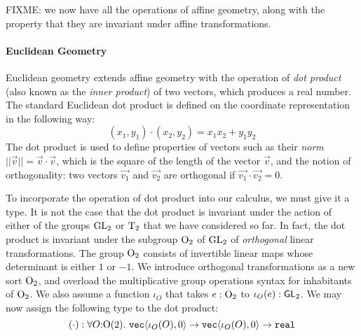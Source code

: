 FIXME: we now have all the operations of affine geometry, along with
the property that they are invariant under affine transformations.

\paragraph{Euclidean Geometry} Euclidean geometry extends affine
geometry with the operation of \emph{dot product} (also known as the
\emph{inner product}) of two vectors, which produces a real
number. The standard Euclidean dot product is defined on the
coordinate representation in the following way:
\begin{displaymath}
  (x_1,y_1) \cdot (x_2,y_2) = x_1x_2 + y_1y_2
\end{displaymath}
The dot product is used to define properties of vectors such as their
\emph{norm} $||\vec{v}|| = \vec{v}\cdot\vec{v}$, which is the square
of the length of the vector $\vec{v}$, and the notion of
orthogonality: two vectors $\vec{v_1}$ and $\vec{v_2}$ are orthogonal
if $\vec{v_1}\cdot\vec{v_2} = 0$.

To incorporate the operation of dot product into our calculus, we must
give it a type. It is not the case that the dot product is invariant
under the action of either of the groups $\mathrm{GL}_2$ or $\mathrm{T}_2$ that
we have considered so far. In fact, the dot product is invariant under
the subgroup $\mathrm{O}_2$ of $\mathrm{GL}_2$ of \emph{orthogonal} linear
transformations. The group $\mathrm{O}_2$ consists of invertible linear
maps whose determinant is either $1$ or $-1$. We introduce orthogonal
transformations as a new sort $\mathrm{O}_2$, and overload the
multiplicative group operations syntax for inhabitants of
$\mathrm{O}_2$. We also assume a function $\iota_O$ that takes $e :
\mathrm{O}_2$ to $\iota_O(e) : \mathsf{GL}_2$. We may now assign the following type
to the dot product:
\begin{displaymath}
  (\cdot) : \forall O \mathord: \mathrm{O}(2).\ \texttt{vec}\langle \iota_O(O), 0 \rangle \to \texttt{vec}\langle \iota_O(O), 0 \rangle \to \texttt{real}
\end{displaymath}

